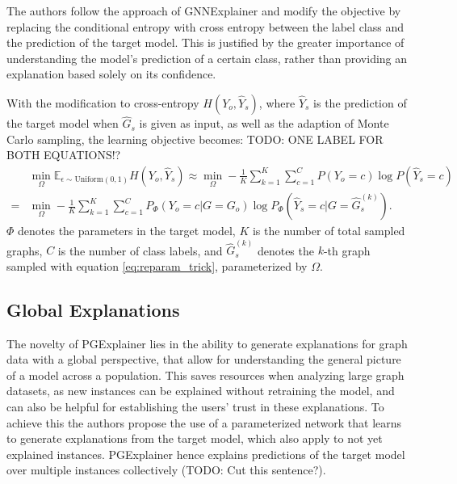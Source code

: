 The authors follow the approach of GNNExplainer\cite{ying2019gnnexplainer} and modify the objective by replacing the conditional entropy with cross entropy between the label class and the prediction of the target model. This is justified by the greater importance of understanding the model's prediction of a certain class, rather than providing an explanation based solely on its confidence.

With the modification to cross-entropy $H(Y_o, \hat{Y}_s)$, where $\hat{Y}_s$ is the prediction of the target model when $\hat{G}_s$ is given as input, as well as the adaption of Monte Carlo sampling, the learning objective becomes:
TODO: ONE LABEL FOR BOTH EQUATIONS!?
\begin{align}
    \label{eq:monte_carlo}
    &\min_\Omega\mathbb{E}_{\epsilon\sim\text{Uniform}(0,1)}H(Y_o, \hat{Y}_s) \approx \min_\Omega -\frac{1}{K}\sum_{k=1}^K\sum_{c=1}^C P(Y_o = c) \log P(\hat{Y}_s = c) \\
    = &\min_\Omega -\frac{1}{K}\sum_{k=1}^K\sum_{c=1}^C P_\Phi (Y_o = c|G = G_o) \log P_\Phi(\hat{Y}_s = c|G=\hat{G}_s^{(k)}).
\end{align}
$\Phi$ denotes the parameters in the target model, $K$ is the number of total sampled graphs, $C$ is the number of class labels, and $\hat{G}_s^{(k)}$ denotes the $k$-th graph sampled with equation \ref{eq:reparam_trick}, parameterized by $\Omega$. %





\subsection{Global Explanations}
The novelty of PGExplainer lies in the ability to generate explanations for graph data with a global perspective, that allow for understanding the general picture of a model across a population. This saves resources when analyzing large graph datasets, as new instances can be explained without retraining the model, and can also be helpful for establishing the users' trust in these explanations. To achieve this the authors propose the use of a parameterized network that learns to generate explanations from the target model, which also apply to not yet explained instances. PGExplainer hence explains predictions of the target model over multiple instances collectively (TODO: Cut this sentence?).

